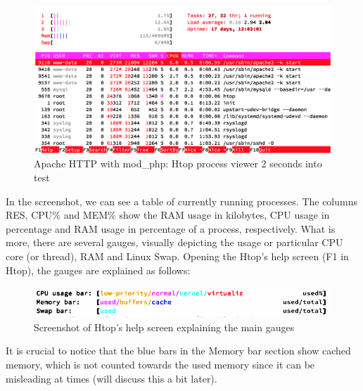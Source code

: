 \begin{figure}[H]
\begin{center}
\includegraphics[scale=0.5]{figures/Apache_mod_php_2s.png}
\caption{Apache HTTP with mod\_php: Htop process viewer 2 seconds into test}
\label{fig:apache_mod_php_2s}
\end{center}
\end{figure}

In the screenshot, we can see a table of currently running processes. The columns RES, CPU\% and MEM\% show the RAM usage in kilobytes, CPU usage in percentage and RAM usage in percentage of a process, respectively. What is more, there are several gauges, visually depicting the usage or particular CPU core (or thread), RAM and Linux Swap. Opening the Htop's help screen (F1 in Htop), the gauges are explained as follows:

\begin{figure}[H]
\begin{center}
\includegraphics{figures/htop_help_gauges.png}
\caption{Screenshot of Htop's help screen explaining the main gauges}
\label{fig:htop_help_gauges}
\end{center}
\end{figure}

It is crucial to notice that the blue bars in the Memory bar section show cached memory, which is not counted towards the used memory since it can be misleading at times (will discuss this a bit later).

